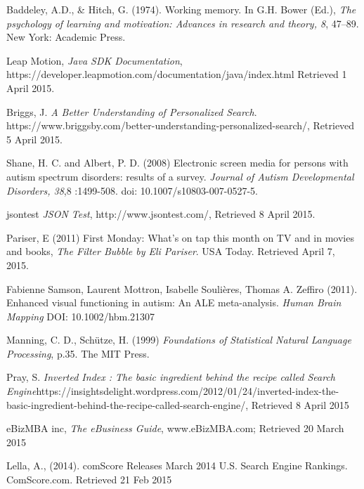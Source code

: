 \documentclass[a4paper, 10pt]{article}
\begin{document}
\begin{thebibliography}{100}
Baddeley, A.D., \& Hitch, G. (1974). Working memory. In G.H. Bower (Ed.), \textit{The psychology of learning and motivation: Advances in research and theory, 8}, 47–89. New York: Academic Press.

 Leap Motion, \textit{Java SDK Documentation}, \\https://developer.leapmotion.com/documentation/java/index.html Retrieved 1 April 2015.

Briggs, J. \textit{A Better Understanding of Personalized Search}. https://www.briggsby.com/better-understanding-personalized-search/, Retrieved 5 April 2015.

Shane, H. C. and Albert, P. D. (2008) Electronic screen media for persons with autism spectrum disorders: results of a survey. \textit{Journal of Autism Developmental Disorders, 38},8 :1499-508. doi: 10.1007/s10803-007-0527-5.

jsontest \textit{JSON Test}, http://www.jsontest.com/, Retrieved 8 April 2015.

 Pariser, E (2011) First Monday: What's on tap this month on TV and in movies and books, \textit{The Filter Bubble by Eli Pariser}. USA Today. Retrieved April 7, 2015. 

Fabienne Samson, Laurent Mottron, Isabelle Soulières, Thomas A. Zeffiro (2011). Enhanced visual functioning in autism: An ALE meta-analysis. \textit{Human Brain Mapping} DOI: 10.1002/hbm.21307

Manning, C. D., Schütze, H. (1999) \textit{Foundations of Statistical Natural Language Processing}, p.35. The MIT Press.

 Pray, S. \textit{Inverted Index : The basic ingredient behind the recipe called Search Engine}https://insightsdelight.wordpress.com/2012/01/24/inverted-index-the-basic-ingredient-behind-the-recipe-called-search-engine/, Retrieved 8 April 2015

eBizMBA inc, \textit{The eBusiness Guide}, www.eBizMBA.com; Retrieved 20 March 2015

Lella, A., (2014). comScore Releases March 2014 U.S. Search Engine Rankings. ComScore.com. Retrieved 21 Feb 2015

\end{thebibliography}
\end{document}
